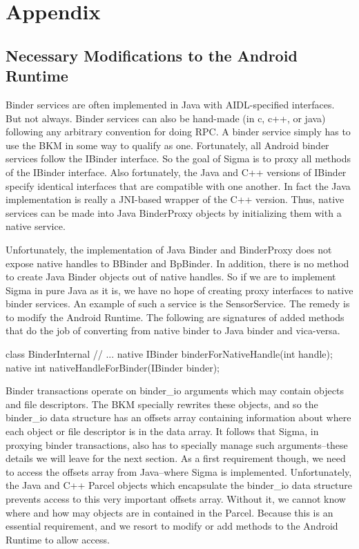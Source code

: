 \documentclass[prodmode]{acmlarge}
\begin{document}
\pagebreak[4]
\section{Appendix}

\subsection{Necessary Modifications to the Android Runtime}
\label{sec:AndroidRuntimeModifications}
Binder services are often implemented in Java with AIDL-specified interfaces. But not always. Binder services can also be hand-made (in c, c++, or java) following any arbitrary convention for doing RPC. A binder service simply has to use the BKM in some way to qualify as one. Fortunately, all Android binder services follow the IBinder interface. So the goal of Sigma is to proxy all methods of the IBinder interface. Also fortunately, the Java and C++ versions of IBinder specify identical interfaces that are compatible with one another. In fact the Java implementation is really a JNI-based wrapper of the C++ version. Thus, native services can be made into Java BinderProxy objects by initializing them with a native service.

Unfortunately, the implementation of Java Binder and BinderProxy does not expose native handles to BBinder and BpBinder. In addition, there is no method to create Java Binder objects out of native handles. So if we are to implement Sigma in pure Java as it is, we have no hope of creating proxy interfaces to native binder services. An example of such a service is the SensorService. The remedy is to modify the Android Runtime. The following are signatures of added methods that do the job of converting from native binder to Java binder and vica-versa.

\begin{snippet}
class BinderInternal {
  // ...
  native IBinder binderForNativeHandle(int handle);
  native int nativeHandleForBinder(IBinder binder);
}
\end{snippet}

Binder transactions operate on binder\_io arguments which may contain objects and file descriptors. The BKM specially rewrites these objects, and so the binder\_io data structure has an offsets array containing information about where each object or file descriptor is in the data array. It follows that Sigma, in proxying binder transactions, also has to specially manage such arguments--these details we will leave for the next section. As a first requirement though, we need to access the offsets array from Java--where Sigma is implemented. Unfortunately, the Java and C++ Parcel objects which encapsulate the binder\_io data structure prevents access to this very important offsets array. Without it, we cannot know where and how may objects are in contained in the Parcel. Because this is an essential requirement, and we resort to modify or add methods to the Android Runtime to allow access.
\end{document}
